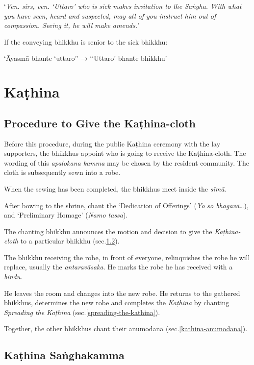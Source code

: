 ‘\emph{Ven. sirs, ven. ‘Uttaro’ who is sick makes invitation to the Saṅgha. With
  what you have seen, heard and suspected, may all of you instruct him out of
  compassion. Seeing it, he will make amends.}’

If the conveying bhikkhu is senior to the sick bhikkhu:

‘Āyasmā bhante ‘uttaro’’ → ‘‘Uttaro’ bhante bhikkhu’


\ifreferenceedition
\clearpage
\fi

\section{Kaṭhina}

\subsection{Procedure to Give the Kaṭhina-cloth}

Before this procedure, during the public Kaṭhina ceremony with the lay
supporters, the bhikkhus appoint who is going to receive the Kaṭhina-cloth. The
wording of this \emph{apalokana kamma} may be chosen by the resident community.
The cloth is subsequently sewn into a robe.

When the sewing has been completed, the bhikkhus meet inside the \emph{sīmā}.

After bowing to the shrine, chant the `Dedication of Offerings' (\emph{Yo so
  bhagavā}\ldots), and `Preliminary Homage' (\emph{Namo tassa}).

The chanting bhikkhu announces the motion and decision to give the
\emph{Kaṭhina-cloth} to a particular bhikkhu (sec.\ref{kathina-sanghakamma}).

The bhikkhu receiving the robe, in front of everyone, relinquishes the robe he
will replace, usually the \emph{antaravāsaka}. He marks the robe he has received
with a \emph{bindu}.

He leaves the room and changes into the new robe. He returns to the
gathered bhikkhus, determines the new robe and completes the \emph{Kaṭhina} by
chanting \emph{Spreading the Kaṭhina} (sec.\ref{spreading-the-kathina}).

Together, the other bhikkhus chant their anumodanā (sec.\ref{kathina-anumodana}).

\ifhandbookedition
\clearpage
\fi

\subsection{Kaṭhina Saṅghakamma}
\label{kathina-sanghakamma}

